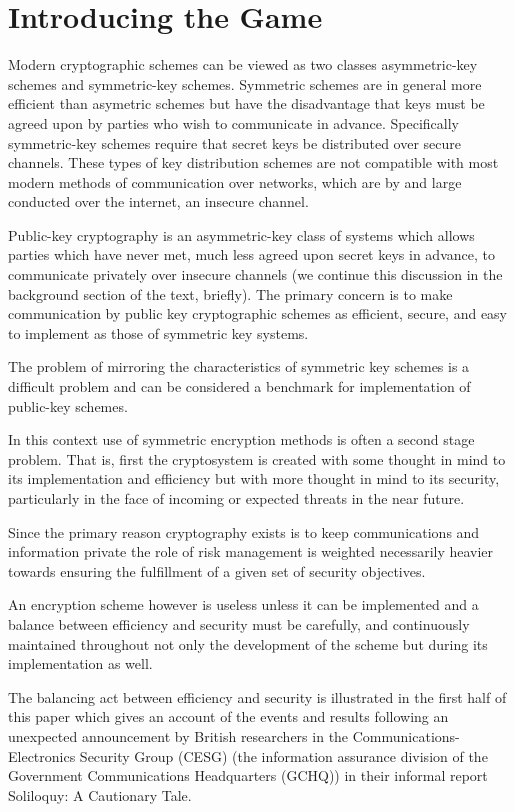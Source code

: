 \chapter{Introducing the Game}

Modern cryptographic schemes can be viewed as two classes
asymmetric-key schemes and symmetric-key schemes.
Symmetric schemes are in general more efficient than asymetric
schemes but have the disadvantage that keys must be agreed upon by
parties who wish to communicate in advance. Specifically symmetric-key
schemes require that secret keys be distributed over secure channels.
These types of key distribution schemes are not compatible with most
modern methods of communication over networks, which are by and large
conducted over the internet, an insecure channel.

Public-key cryptography is an asymmetric-key class of systems which
allows parties which have never met, much less agreed upon secret keys
in advance, to communicate privately over insecure channels (we
continue this discussion in the background section of the text,
briefly). The primary concern is to make communication by public key
cryptographic schemes as efficient, secure, and easy to implement as
those of symmetric key systems.

The problem of mirroring the characteristics of symmetric key
schemes is a difficult problem and can be considered a benchmark for
implementation of public-key schemes.

In this context use of symmetric encryption methods is often a second
stage problem. That is, first the cryptosystem is created with some
thought in mind to its implementation and efficiency but with more
thought in mind to its security, particularly in the face of incoming
or expected threats in the near future.

Since the primary reason cryptography exists is to keep
communications and information private the role of risk management is
weighted necessarily heavier towards ensuring the fulfillment of a
given set of security objectives.

An encryption scheme however is useless unless it can be implemented
and a balance between efficiency and security must be carefully, and
continuously maintained throughout not only the development of the
scheme but during its implementation as well.

The balancing act between efficiency and security is illustrated in
the first half of this paper which gives an account of the events and
results following an unexpected announcement by British researchers in
the Communications-Electronics Security Group (CESG) (the information
assurance division of the Government Communications Headquarters
(GCHQ)) in their informal report Soliloquy: A Cautionary Tale.

